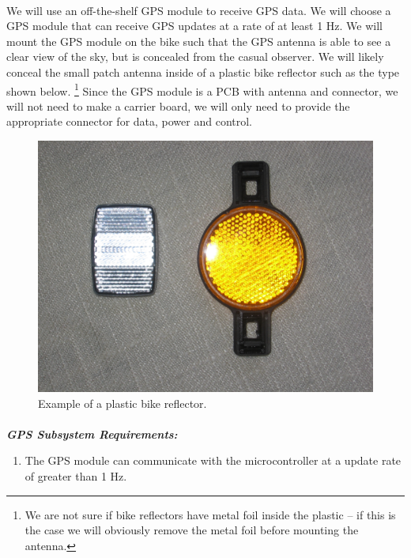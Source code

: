 \documentclass{article}
\begin{document}
\paragraph{} 
We will use an off-the-shelf GPS module to receive GPS data. We will choose a GPS module that can receive GPS updates at a rate of at least 1 Hz. We will mount the GPS module on the bike such that the GPS antenna is able to see a clear view of the sky, but is concealed from the casual observer. We will likely conceal the small patch antenna inside of a plastic bike reflector such as the type shown below. \footnote{We are not sure if bike reflectors have metal foil inside the plastic -- if this is the case we will obviously remove the metal foil before mounting the antenna.} Since the GPS module is a PCB with antenna and connector, we will not need to make a carrier board, we will only need to provide the appropriate connector for data, power and control. 

\begin{center}
	\begin{figure}[H]
		\centering
		\includegraphics[width=0.25 \textwidth]{bike_reflector.jpg}
		\caption{Example of a plastic bike reflector.} \label{reflector}
	\end{figure}
\end{center}


\paragraph{} 


\textit{\textbf{GPS Subsystem Requirements:}}

\begin{enumerate}
	\item The GPS module can communicate with the microcontroller at a update rate of greater than 1 Hz. 
\end{enumerate}	
\end{document}

